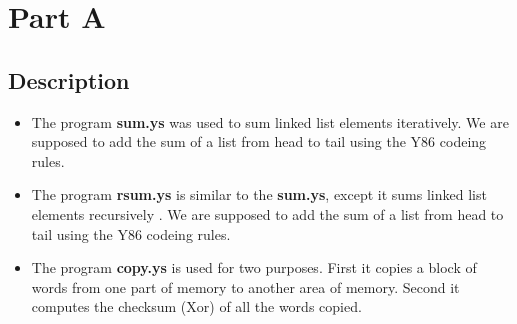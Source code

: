 \documentclass[12pt,a4paper]{article}
\theoremstyle{definition}
\numberwithin{equation}{section}
\numberwithin{figure}{section}
\begin{document}
\section{Part A}
\subsection{Description}
\begin{itemize}
	\item The program \textbf{sum.ys} was used to sum linked list elements iteratively. We are supposed to add the sum of a list from head to tail using the Y86 codeing rules.
	\item The program \textbf{rsum.ys} is similar to the \textbf{sum.ys}, except it sums linked list elements recursively . We are supposed to add the sum of a list from head to tail using the Y86 codeing rules.
	\item The program \textbf{copy.ys} is used for two purposes. First it copies a block of words from one part of memory to another area of memory. Second it computes the checksum (Xor) of all the words copied.
	
\end{itemize}
\end{document}
